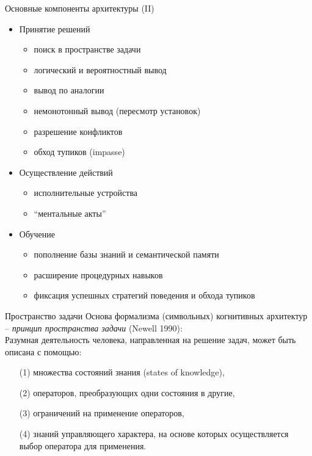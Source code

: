 \documentclass{beamer}
\begin{document}
\begin{frame}{Основные компоненты архитектуры (II)}
\begin{itemize}
	\item Принятие решений
	    \medskip
	    \begin{itemize}
	        \item поиск в пространстве задачи
	        \item логический и вероятностный вывод
	        \item вывод по аналогии
	        \item немонотонный вывод (пересмотр установок)
	        \item разрешение конфликтов
	        \item обход тупиков (impasse)
	    \end{itemize}	
	\medskip
	\item Осуществление действий
	    \medskip
	    \begin{itemize}
	        \item исполнительные устройства
	        \item ``ментальные акты''
	    \end{itemize}	
	\medskip
	\item Обучение
		\medskip
	    \begin{itemize}
	        \item пополнение базы знаний и семантической памяти
	        \item расширение процедурных навыков
	        \item фиксация успешных стратегий поведения и обхода тупиков
	    \end{itemize}	
\end{itemize}
\end{frame}


\begin{frame}{Пространство задачи}
Основа формализма (символьных) когнитивных архитектур -- \textit{принцип пространства задачи} (Newell 1990):\\
\bigskip
Разумная деятельность человека, направленная на решение задач, может быть описана с помощью:
\begin{itemize}
    \item[(1)] множества состояний знания (states of knowledge),
	\item[(2)] операторов, преобразующих одни состояния в другие,
	\item[(3)] ограничений на применение операторов, 
	\item[(4)] знаний управляющего характера, на основе которых осуществляется выбор оператора для применения.
\end{itemize}
\end{frame}
\end{document}
